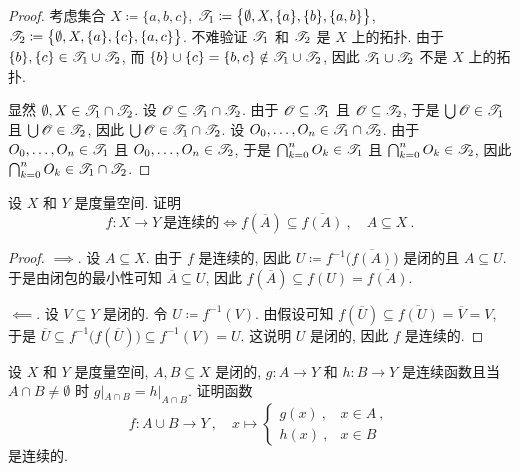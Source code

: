 \begin{proof}
    考虑集合 \(X \coloneqq \{a, b, c\}\), \(\mathscr T_1 \coloneqq \bigl\{\emptyset, X, \{a\}, \{b\}, \{a, b\}\bigr\}\), \(\mathscr T_2 \coloneqq \bigl\{\emptyset, X, \{a\}, \{c\}, \{a, c\}\bigr\}\). 不难验证 \(\mathscr T_1\) 和 \(\mathscr T_2\) 是 \(X\) 上的拓扑. 由于 \(\{b\}, \{c\} \in \mathscr T_1 \cup \mathscr T_2\), 而 \(\{b\} \cup \{c\} = \{b, c\} \notin \mathscr T_1 \cup \mathscr T_2\), 因此 \(\mathscr T_1 \cup \mathscr T_2\) 不是 \(X\) 上的拓扑.

    显然 \(\emptyset, X \in \mathscr T_1 \cap \mathscr T_2\). 设 \(\mathscr O \subseteq \mathscr T_1 \cap \mathscr T_2\). 由于 \(\mathscr O \subseteq \mathscr T_1\) 且 \(\mathscr O \subseteq \mathscr T_2\), 于是 \(\bigcup \mathscr O \in \mathscr T_1\) 且 \(\bigcup \mathscr O \in \mathscr T_2\), 因此 \(\bigcup \mathscr O \in \mathscr T_1 \cap \mathscr T_2\). 设 \(O_0, \ldots, O_n \in \mathscr T_1 \cap \mathscr T_2\). 由于 \(O_0, \ldots, O_n \in \mathscr T_1\) 且 \(O_0, \ldots, O_n \in \mathscr T_2\), 于是 \(\bigcap_{k = 0}^n O_k \in \mathscr T_1\) 且 \(\bigcap_{k = 0}^n O_k \in \mathscr T_2\), 因此 \(\bigcap_{k = 0}^n O_k \in \mathscr T_1 \cap \mathscr T_2\).
\end{proof}

\begin{exercise}
    设 \(X\) 和 \(Y\) 是度量空间. 证明
    \[
        f \colon X \to Y\ \text{是连续的} \iff f(\overline A) \subseteq \overline{f(A)}\ ,\quad A \subseteq X\ .
    \]
\end{exercise}

\begin{proof}
    \(\implies\). 设 \(A \subseteq X\). 由于 \(f\) 是连续的, 因此 \(U \coloneqq f^{- 1}\bigl(\overline{f(A)}\bigr)\) 是闭的且 \(A \subseteq U\). 于是由闭包的最小性可知 \(\overline A \subseteq U\), 因此 \(f(\overline A) \subseteq f(U) = \overline{f(A)}\).

    \(\impliedby\). 设 \(V \subseteq Y\) 是闭的. 令 \(U \coloneqq f^{- 1}(V)\). 由假设可知 \(f(\overline U) \subseteq \overline{f(U)} = \overline V = V\), 于是 \(\overline U \subseteq f^{- 1}\bigl(f(\overline U)\bigr) \subseteq f^{- 1}(V) = U\). 这说明 \(U\) 是闭的, 因此 \(f\) 是连续的.
\end{proof}

\begin{exercise}[粘接引理]
    设 \(X\) 和 \(Y\) 是度量空间, \(A, B \subseteq X\) 是闭的, \(g \colon A \to Y\) 和 \(h \colon B \to Y\) 是连续函数且当 \(A \cap B \neq \emptyset\) 时 \(g|_{A \cap B} = h|_{A \cap B}\). 证明函数
    \[
        f \colon A \cup B \to Y\ ,\quad x \mapsto
        \begin{cases}
            g(x)\ , & x \in A\ , \\
            h(x)\ , & x \in B
        \end{cases}
    \]
    是连续的.
\end{exercise}


